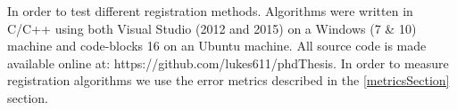 
In order to test different registration methods. Algorithms were written in C/C++ using both Visual Studio (2012 and 2015) on a Windows (7 \& 10) machine and code-blocks 16 on an Ubuntu machine. All source code is made available online at: https://github.com/lukes611/phdThesis. In order to measure registration algorithms we use the error metrics described in the \ref{metricsSection} section.  
